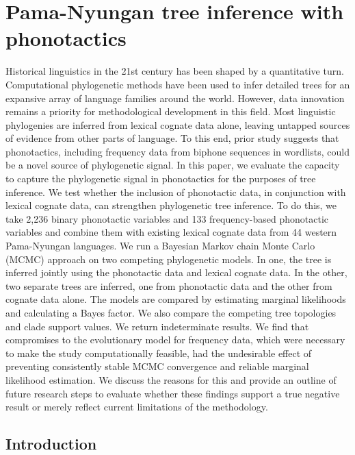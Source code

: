 \chapter[Pama-Nyungan tree inference with phonotactics]{Pama-Nyungan tree inference with phonotactics}
\label{ch-pn-treebuilding}	%
\pagestyle{headings}


Historical linguistics in the 21st century has been shaped by a quantitative turn. Computational phylogenetic methods have been used to infer detailed trees for an expansive array of language families around the world. However, data innovation remains a priority for methodological development in this field. Most linguistic phylogenies are inferred from lexical cognate data alone, leaving untapped sources of evidence from other parts of language. To this end, prior study suggests that phonotactics, including frequency data from biphone sequences in wordlists, could be a novel source of phylogenetic signal. In this paper, we evaluate the capacity to capture the phylogenetic signal in phonotactics for the purposes of tree inference. We test whether the inclusion of phonotactic data, in conjunction with lexical cognate data, can strengthen phylogenetic tree inference. To do this, we take 2,236 binary phonotactic variables and 133 frequency-based phonotactic variables and combine them with existing lexical cognate data from 44 western Pama-Nyungan languages. We run a Bayesian Markov chain Monte Carlo (MCMC) approach on two competing phylogenetic models. In one, the tree is inferred jointly using the phonotactic data and lexical cognate data. In the other, two separate trees are inferred, one from phonotactic data and the other from cognate data alone. The models are compared by estimating marginal likelihoods and calculating a Bayes factor. We also compare the competing tree topologies and clade support values. We return indeterminate results. We find that compromises to the evolutionary model for frequency data, which were necessary to make the study computationally feasible, had the undesirable effect of preventing consistently stable MCMC convergence and reliable marginal likelihood estimation. We discuss the reasons for this and provide an outline of future research steps to evaluate whether these findings support a true negative result or merely reflect current limitations of the methodology.

\hypertarget{pn-tree-intro}{%
\section{Introduction}\label{pn-tree-intro}}

